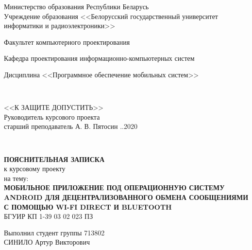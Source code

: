 
\begin{titlepage}
  \begin{center}
    Министерство образования Республики Беларусь\\
    Учреждение образования <<Белорусский государственный университет информатики и радиоэлектроники>>\\[1.15em]

    \begin{minipage}{\textwidth}
      \begin{center}
          Факультет компьютерного проектирования

          Кафедра проектирования информационно-компьютерных систем

          Дисциплина <<Программное обеспечение мобильных систем>>
      \end{center}
    \end{minipage}\\[2em]

    \begin{flushright}
      \begin{minipage}{0.5\textwidth}
	    \begin{flushleft}
          <<К ЗАЩИТЕ ДОПУСТИТЬ>>\\
          Руководитель курсового проекта\\
		  старший преподаватель
          \underline{\hspace*{2.8cm}}А. В. Пятосин
          \underline{\hspace*{2em}}.\underline{\hspace*{2em}}.2020
	    \end{flushleft}
      \end{minipage}\\[2.2em]
    \end{flushright}

	\textbf{\MakeTextUppercase{ПОЯСНИТЕЛЬНАЯ ЗАПИСКА}}\\
    {к курсовому проекту}\\
    {на тему:}\\
	\textbf{\MakeTextUppercase{Мобильное приложение под операционную систему Android для децентрализованного обмена сообщениями с помощью Wi-Fi Direct и Bluetooth}}\\[1em]

	{БГУИР КП 1-39 03 02 023 ПЗ}\\[2em]

    \begin{flushright}
      \begin{minipage}{0.5\textwidth}
        \begin{flushleft}
          Выполнил студент группы 713802\\
		  \MakeTextUppercase{Синило} Артур Викторович\\
		  \underline{\hspace*{8cm}}


\end{flushleft}
\end{minipage}
\end{flushright}
\end{center}
\end{titlepage}
